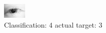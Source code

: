 \begin{figure}[h!]
\begin{center}
\includegraphics[width=0.60\columnwidth]{figures/ID5_class_4_target_3.png}
\end{center}
\caption{ Classification: 4 actual target: 3}
\label{fig:ID5_class_4_target_3}
\end{figure}
